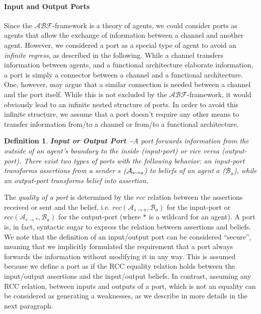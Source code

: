 \documentclass[conference]{IEEEtran}
\newcommand{\assertionRegion}{\mathcal{A}}
\newcommand{\beliefRegion}{\mathcal{B}}
\newcommand{\factRegion}{\mathcal{F}}
\newcommand{\rcc}{rcc}
\newcommand{\abftheory}{\assertionRegion\beliefRegion\factRegion}
\newcommand{\Rcc}[2]{rcc(#1,#2)}
\newcommand{\rassert}[3]{\mathcal{A}_{#1\rightarrow #2}#3}
\newtheorem{definition}{Definition}%
\begin{document}
\paragraph{Input and Output Ports}
Since the $\abftheory$-framework is a theory of agents, we could consider ports as
agents that allow the exchange of information between a channel and another
agent.  However, we considered a port as a special type of agent to avoid
an \emph{infinite regress}, as described in the following. While a channel transfers information between agents, and
a functional architecture elaborate information, a port is simply a connector between
a channel and a functional architecture. One, however, may argue that a similar
connection is needed between a channel and the port itself. While this is not 
excluded by the $\abftheory$-framework, it would obviously lead to an infinite
nested structure of ports. In order to avoid this infinite structure, we assume
that a port doesn't require any other means to transfer information from/to a channel
or from/to a functional architecture. 

\begin{definition}{\bf Input or Output Port --}\label{def:port} 
	A port forwards information from the outside of an agent's boundary to
	the inside (input-port) or vice versa (output-port).  There exist two
	types of ports with the following behavior: an input-port 
	transforms assertions from a sender $s$ ($\rassert{s}{a}$) to beliefs
	of an agent $a$ ($\beliefRegion_a$), while an output-port transforms belief
	into assertion.
\end{definition}
The \emph{quality of a port} is determined by the $\rcc$ relation between the
assertions received or sent and the belief, i.e.
$\Rcc{\rassert{s}{a}}{\beliefRegion_a}$ for the input-port or
$\Rcc{\rassert{r}{*}}{\beliefRegion_a}$ for the output-port (where $*$ is a wildcard for an agent).  A port is, in
fact, syntactic sugar to express the relation between assertions and beliefs.
We note that the definition of an input/output port can
be considered ``secure'', meaning that we implicitly formulated the requirement
that a port always forwards the information without modifying it in any way.
This is assumed because we define a port as if the RCC equality relation holds
between the input/output assertions and the input/output beliefs.  In contrast,
assuming any RCC relation, between inputs and outputs of a port, which is not
an equality can be considered as generating a weaknesses, as we describe in
more details in the next paragraph.
\end{document}
